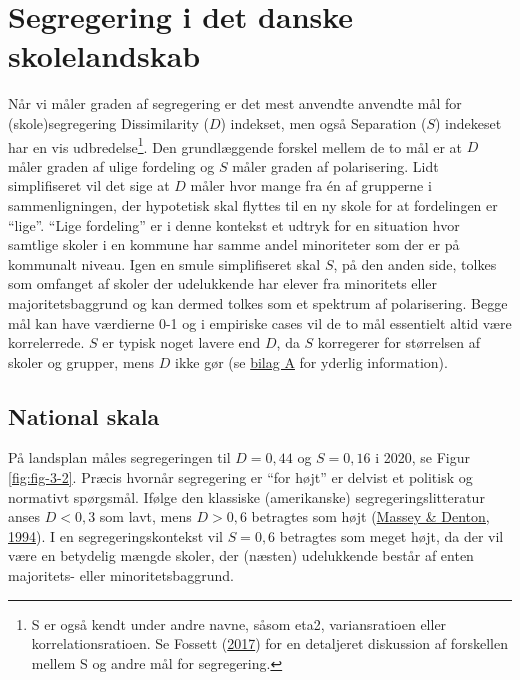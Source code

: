 \documentclass[
]{book}
\begin{document}
\hypertarget{segregering-i-det-danske-skolelandskab}{%
\section{Segregering i det danske skolelandskab}\label{segregering-i-det-danske-skolelandskab}}

Når vi måler graden af segregering er det mest anvendte anvendte mål for (skole)segregering Dissimilarity (\(D\)) indekset, men også Separation (\(S\)) indekeset har en vis udbredelse\footnote{S er også kendt under andre navne, såsom eta2, variansratioen eller korrelationsratioen. Se Fossett (\protect\hyperlink{ref-fossett2017}{2017}) for en detaljeret diskussion af forskellen mellem S og andre mål for segregering.}. Den grundlæggende forskel mellem de to mål er at \(D\) måler graden af ulige fordeling og \(S\) måler graden af polarisering. Lidt simplifiseret vil det sige at \(D\) måler hvor mange fra én af grupperne i sammenligningen, der hypotetisk skal flyttes til en ny skole for at fordelingen er ``lige''. ``Lige fordeling'' er i denne kontekst et udtryk for en situation hvor samtlige skoler i en kommune har samme andel minoriteter som der er på kommunalt niveau. Igen en smule simplifiseret skal \(S\), på den anden side, tolkes som omfanget af skoler der udelukkende har elever fra minoritets eller majoritetsbaggrund og kan dermed tolkes som et spektrum af polarisering. Begge mål kan have værdierne 0-1 og i empiriske cases vil de to mål essentielt altid være korrelerrede. \(S\) er typisk noget lavere end \(D\), da \(S\) korregerer for størrelsen af skoler og grupper, mens \(D\) ikke gør (se \protect\hyperlink{bilag1}{bilag A} for yderlig information).

\hypertarget{national-skala}{%
\subsection{National skala}\label{national-skala}}

På landsplan måles segregeringen til \(D = 0,44\) og \(S = 0,16\) i 2020, se Figur \ref{fig:fig-3-2}. Præcis hvornår segregering er ``for højt'' er delvist et politisk og normativt spørgsmål. Ifølge den klassiske (amerikanske) segregeringslitteratur anses \(D < 0,3\) som lavt, mens \(D > 0,6\) betragtes som højt (\protect\hyperlink{ref-massey1994}{Massey \& Denton, 1994}). I en segregeringskontekst vil \(S=0,6\) betragtes som meget højt, da der vil være en betydelig mængde skoler, der (næsten) udelukkende består af enten majoritets- eller minoritetsbaggrund.
\end{document}
